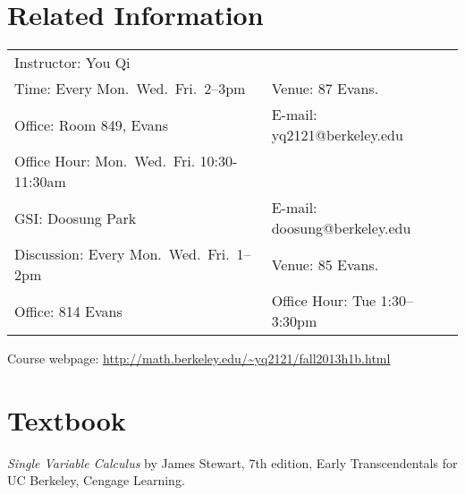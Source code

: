 \documentclass[margin,line]{res}
\begin{document}

\begin{resume}

\section{\sc Related Information}
\vspace{.05in}
\begin{tabular}{@{}p{3.4in}p{4in}}
Instructor: You Qi            &   \\
Time: Every Mon.~Wed.~Fri.~2--3pm & Venue: 87 Evans.\\
Office: Room 849, Evans   & E-mail:  yq2121@berkeley.edu \\
Office Hour: Mon.~Wed.~Fri. 10:30-11:30am &\\
GSI: Doosung Park & E-mail: doosung@berkeley.edu\\
Discussion: Every Mon.~Wed.~Fri.~1--2pm & Venue: 85 Evans.\\
Office: 814 Evans & Office Hour: Tue 1:30--3:30pm\\
\end{tabular}
Course webpage: \url{http://math.berkeley.edu/~yq2121/fall2013h1b.html}


\section{\sc Textbook} \emph{Single Variable Calculus}
by James Stewart, 7th edition, Early Transcendentals for UC Berkeley, Cengage Learning.


\end{resume}
\end{document}
